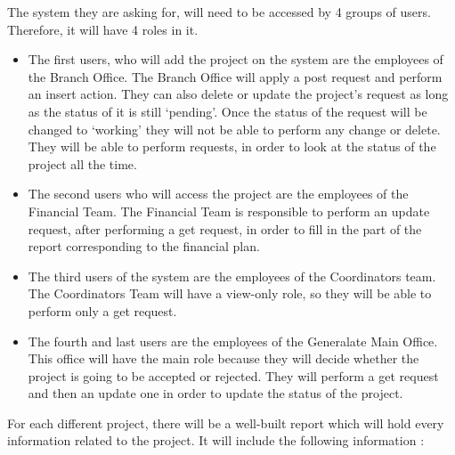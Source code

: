 The system they are asking for, will need to be accessed by 4 groups of users. Therefore, it will have 4 roles in it.
\begin{itemize}
\item The first users, who will add the project on the system are the employees of the Branch Office. The Branch Office will apply a post request and perform an insert action. They can also delete or update the project’s request as long as the status of it is still ‘pending’. Once the status of the request will be changed to ‘working’ they will not be able to perform any change or delete. They will be able to perform requests, in order to look at the status of the project all the time.
\item The second users who will access the project are the employees of the Financial Team. The Financial Team is responsible to perform an update request, after performing a get request, in order to fill in the part of the report corresponding to the financial plan.
\item The third users of the system are the employees of the Coordinators team. The Coordinators Team will have a view-only role, so they will be able to perform only a get request.
\item The fourth and last users are the employees of the Generalate Main Office. This office will have the main role because they will decide whether the project is going to be accepted or rejected. They will perform a get request and then an update one in order to update the status of the project.
   
\end{itemize}
For each different project, there will be a well-built report which will hold every information related to the project. It will include the following information :

